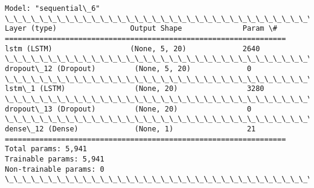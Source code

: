 \documentclass[11pt]{article}
\begin{document}
    \begin{Verbatim}[commandchars=\\\{\}]
Model: "sequential\_6"
\_\_\_\_\_\_\_\_\_\_\_\_\_\_\_\_\_\_\_\_\_\_\_\_\_\_\_\_\_\_\_\_\_\_\_\_\_\_\_\_\_\_\_\_\_\_\_\_\_\_\_\_\_\_\_\_\_\_\_\_\_\_\_\_\_
Layer (type)                 Output Shape              Param \#
=================================================================
lstm (LSTM)                  (None, 5, 20)             2640
\_\_\_\_\_\_\_\_\_\_\_\_\_\_\_\_\_\_\_\_\_\_\_\_\_\_\_\_\_\_\_\_\_\_\_\_\_\_\_\_\_\_\_\_\_\_\_\_\_\_\_\_\_\_\_\_\_\_\_\_\_\_\_\_\_
dropout\_12 (Dropout)         (None, 5, 20)             0
\_\_\_\_\_\_\_\_\_\_\_\_\_\_\_\_\_\_\_\_\_\_\_\_\_\_\_\_\_\_\_\_\_\_\_\_\_\_\_\_\_\_\_\_\_\_\_\_\_\_\_\_\_\_\_\_\_\_\_\_\_\_\_\_\_
lstm\_1 (LSTM)                (None, 20)                3280
\_\_\_\_\_\_\_\_\_\_\_\_\_\_\_\_\_\_\_\_\_\_\_\_\_\_\_\_\_\_\_\_\_\_\_\_\_\_\_\_\_\_\_\_\_\_\_\_\_\_\_\_\_\_\_\_\_\_\_\_\_\_\_\_\_
dropout\_13 (Dropout)         (None, 20)                0
\_\_\_\_\_\_\_\_\_\_\_\_\_\_\_\_\_\_\_\_\_\_\_\_\_\_\_\_\_\_\_\_\_\_\_\_\_\_\_\_\_\_\_\_\_\_\_\_\_\_\_\_\_\_\_\_\_\_\_\_\_\_\_\_\_
dense\_12 (Dense)             (None, 1)                 21
=================================================================
Total params: 5,941
Trainable params: 5,941
Non-trainable params: 0
\_\_\_\_\_\_\_\_\_\_\_\_\_\_\_\_\_\_\_\_\_\_\_\_\_\_\_\_\_\_\_\_\_\_\_\_\_\_\_\_\_\_\_\_\_\_\_\_\_\_\_\_\_\_\_\_\_\_\_\_\_\_\_\_\_
    \end{Verbatim}
\end{document}
